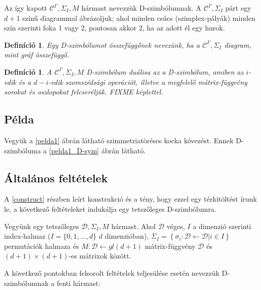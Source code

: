\documentclass[12pt,magyar,a4paper]{article}
\newtheorem{defn}[thm]{Definíció}
\begin{document}
Az így kapott $\mathcal{C}^\Gamma, \Sigma_I, M$ hármast nevezzük D-szimbólumnak. A
$\mathcal{C}^\Gamma, \Sigma_I$ párt egy $d+1$ színű diagrammal ábrázoljuk; ahol
minden csúcs (szimplex-pályák) minden szín szerinti foka 1 vagy 2, pontosan
akkor 2, ha az adott él egy hurok.

\begin{defn}
  Egy D-szimbólumot összefüggőnek nevezünk, ha a $\mathcal{C}^\Gamma, \Sigma_I$
  diagram, mint gráf összefüggő.
\end{defn}

\begin{defn}
  A $\mathcal{C}^\Gamma, \Sigma_I, M$ D-szimbólum duálisa az a D-szimbólum,
  amiben az $i$-edik és a $d-i$-edik szomszédsági operációt, illetve a
  megfelelő mátrix-függvény sorokat és oszlopokat felcseréljük. FIXME képlettel.
\end{defn}

\subsection{Példa}
Vegyük a \ref{pelda1} ábrán látható szimmetriatöréses kocka kövezést. Ennek
D-szimbóluma a \ref{pelda1_D-sym} ábrán látható.

\subsection{Általános feltételek}
A \ref{construct} részben leírt konstrukció és a tény, hogy ezzel egy
térkitöltést írunk le, a következő feltételeket indukálja egy tetszőleges
D-szimbólumra.

Vegyünk egy tetszőleges $\mathcal{D}, \Sigma_I, M$ hármast. Ahol $\mathcal{D}$
véges, $I$ a dimenzió szerinti index-halmaz ($I=\{0,1,\ldots,d\}$ $d$
dimenzióban),
$\Sigma_I=\left\{\sigma_i:\mathcal{D}\leftarrow\mathcal{D}\left|i\in
I\right.\right\}$ permutációk halmaza és $M: \mathcal{D} \leftarrow gl(d+1)$
mátrix-függvény $\mathcal{D}$ és $(d+1)\times(d+1)$-es mátrixok között.

A következő pontokban felsorolt feltételek teljesülése esetén nevezzük
D-szimbólumnak a fenti hármast:
\end{document}
